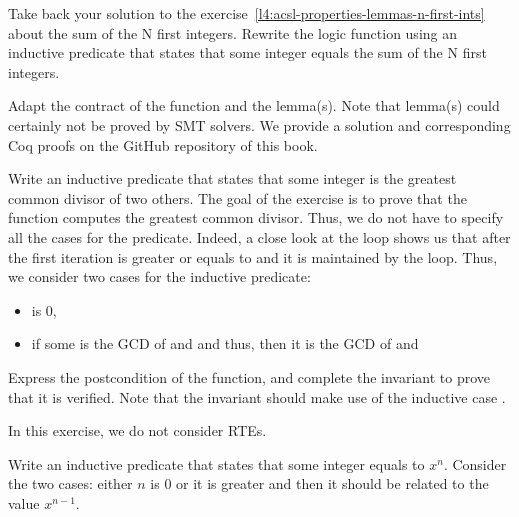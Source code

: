 



Take back your solution to the
exercise~\ref{l4:acsl-properties-lemmas-n-first-ints} about the sum of the N
first integers. Rewrite the logic function using an inductive predicate that
states that some integer equals the sum of the N first integers.




Adapt the contract of the function and the lemma(s). Note that lemma(s) could
certainly not be proved by SMT solvers. We provide a solution and corresponding
Coq proofs on the GitHub repository of this book.




Write an inductive predicate that states that some integer is the greatest common
divisor of two others. The goal of the exercise is to prove that the function
 computes the greatest common divisor. Thus, we do not have to
specify all the cases for the predicate. Indeed, a close look at the loop shows
us that after the first iteration  is greater or equals to
 and it is maintained by the loop. Thus, we consider two cases for
the inductive predicate:


\begin{itemize}
\item {} is 0,
\item if some  is the GCD of  and  and
  thus, then it is the GCD of  and 
\end{itemize}




Express the postcondition of the function, and complete the invariant to prove
that it is verified. Note that the invariant should make use of the inductive
case .





In this exercise, we do not consider RTEs.


Write an inductive predicate that states that some integer  equals
to $x^n$. Consider the two cases: either $n$ is 0 or it is greater and then it
should be related to the value $x^{n-1}$.




